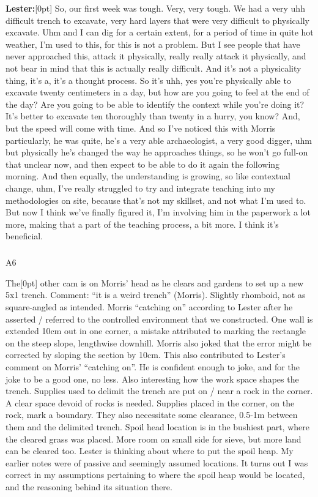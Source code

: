 \documentclass[
]{article}
\makeatletter
\let\oldsubparagraph\subparagraph
\renewcommand{\subparagraph}{
    \@ifstar
      \xxxSubParagraphStar
      \xxxSubParagraphNoStar
  }
\newcommand{\xxxSubParagraphStar}[1]{\oldsubparagraph*{#1}\mbox{}}
\newcommand{\xxxSubParagraphNoStar}[1]{\oldsubparagraph{#1}\mbox{}}
\newcommand{\paragraphnumber}[1]{\marginnote{\color{lightgray}\tiny{#1}}[0pt]}
\makeatother
\begin{document}
\textbf{Lester:}\paragraphnumber{[99]} So, our first week was tough.
Very, very tough. We had a very uhh difficult trench to excavate, very
hard layers that were very difficult to physically excavate. Uhm and I
can dig for a certain extent, for a period of time in quite hot weather,
I'm used to this, for this is not a problem. But I see people that have
never approached this, attack it physically, really really attack it
physically, and not bear in mind that this is actually really difficult.
And it's not a physicality thing, it's a, it's a thought process. So
it's uhh, yes you're physically able to excavate twenty centimeters in a
day, but how are you going to feel at the end of the day? Are you going
to be able to identify the context while you're doing it? It's better to
excavate ten thoroughly than twenty in a hurry, you know? And, but the
speed will come with time. And so I've noticed this with Morris
particularly, he was quite, he's a very able archaeologist, a very good
digger, uhm but physically he's changed the way he approaches things, so
he won't go full-on that unclear now, and then expect to be able to do
it again the following morning. And then equally, the understanding is
growing, so like contextual change, uhm, I've really struggled to try
and integrate teaching into my methodologies on site, because that's not
my skillset, and not what I'm used to. But now I think we've finally
figured it, I'm involving him in the paperwork a lot more, making that a
part of the teaching process, a bit more. I think it's beneficial.

\subparagraph{A6}\label{sec-A6}

The\paragraphnumber{[100]} other cam is on Morris' head as he clears and
gardens to set up a new 5x1 trench. Comment: ``it is a weird trench''
(Morris). Slightly rhomboid, not as square-angled as intended. Morris
``catching on'' according to Lester after he asserted / referred to the
controlled environment that we constructed. One wall is extended 10cm
out in one corner, a mistake attributed to marking the rectangle on the
steep slope, lengthwise downhill. Morris also joked that the error might
be corrected by sloping the section by 10cm. This also contributed to
Lester's comment on Morris' ``catching on''. He is confident enough to
joke, and for the joke to be a good one, no less. Also interesting how
the work space shapes the trench. Supplies used to delimit the trench
are put on / near a rock in the corner. A clear space devoid of rocks is
needed. Supplies placed in the corner, on the rock, mark a boundary.
They also necessitate some clearance, 0.5-1m between them and the
delimited trench. Spoil head location is in the bushiest part, where the
cleared grass was placed. More room on small side for sieve, but more
land can be cleared too. Lester is thinking about where to put the spoil
heap. My earlier notes were of passive and seemingly assumed locations.
It turns out I was correct in my assumptions pertaining to where the
spoil heap would be located, and the reasoning behind its situation
there.
\end{document}
